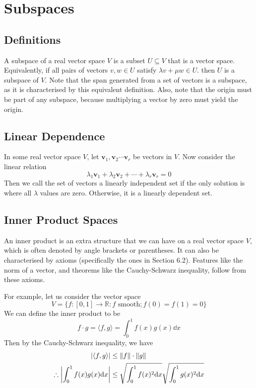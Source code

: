 \documentclass{article}
\begin{document}
\section{Subspaces}
\subsection{Definitions}
A subspace of a real vector space $V$ is a subset $U \subseteq V$ that is a vector space. Equivalently, if all pairs of vectors $v, w \in U$ satisfy $\lambda v + \mu w \in U$. then $U$ is a subspace of $V$. Note that the span generated from a set of vectors is a subspace, as it is characterised by this equivalent definition. Also, note that the origin must be part of any subspace, because multiplying a vector by zero must yield the origin.

\subsection{Linear Dependence}
In some real vector space $V$, let $\bm v_1, \bm v_2 \cdots \bm v_r$ be vectors in $V$. Now consider the linear relation
\[ \lambda_1 \bm v_1 + \lambda_2 \bm v_2 + \cdots + \lambda_r \bm v_r = 0 \]
Then we call the set of vectors a linearly independent set if the only solution is where all $\lambda$ values are zero. Otherwise, it is a linearly dependent set.

\subsection{Inner Product Spaces}
An inner product is an extra structure that we can have on a real vector space $V$, which is often denoted by angle brackets or parentheses. It can also be characterised by axioms (specifically the ones in Section 6.2). Features like the norm of a vector, and theorems like the Cauchy-Schwarz inequality, follow from these axioms.

For example, let us consider the vector space
\[ V = \{ f: [0, 1] \to \mathbb R: f \text{ smooth}; f(0) = f(1) = 0 \} \]
We can define the inner product to be
\[ f \cdot g = \langle f, g \rangle = \int_0^1 f(x)g(x)\dd x \]
Then by the Cauchy-Schwarz inequality, we have
\begin{align*}
	\abs{\langle f, g \rangle}              & \leq \norm{f} \cdot \norm{g}                                  \\
	\therefore \abs{\int_0^1 f(x)g(x)\dd x} & \leq \sqrt{\int_0^1 f(x)^2 \dd x}\sqrt{\int_0^1 g(x)^2 \dd x}
\end{align*}
\end{document}
